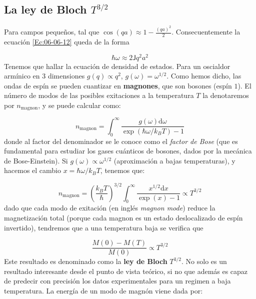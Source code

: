 \documentclass[12pt,a4paper]{book}
\numberwithin{equation}{section}
\numberwithin{figure}{section}
\newcommand{\parentesis}[1]{\left( #1  \right)}
\newcommand{\D}{\mathrm{d}}
\newcommand{\Jsf}{\mathsf{J}}
\begin{document}
\subsection{La ley de Bloch $T^{3/2}$}

Para campos pequeños, tal que $\cos (qa) \approx 1 - \frac{(qa)^2}{2}$. Consecuentemente la ecuación \ref{Ec:06-06-12} queda de la forma

\begin{equation}
    \hbar \omega \approx 2 \Jsf q^2 a^2
\end{equation}
Tenemos que hallar la ecuación de densidad de estados. Para un oscialdor armínico en 3 dimensiones $g(q) \varpropto q^2$, $g(\omega) = \omega^{1/2}$. Como hemos dicho, las ondas de espín se pueden cuantizar en \textbf{magnones}, que son bosones (espín $1$). El número de modos de las posibles exitaciones a la temperatura $T$ la denotaremos por $n_{\mathrm{magnon}}$, y se puede calcular como:

\begin{equation}
    n_{\mathrm{magnon}} = \int_0^\infty \frac{g(\omega) \D \omega}{\exp (\hbar \omega /k_B T) - 1} \label{Ec:06-06-14}
\end{equation}
donde al factor del denominador se le conoce como el \textit{factor de Bose} (que es fundamental para estudiar los gases cuánticos de bosones, dados por la mecánica de Bose-Einstein). Si $g(\omega) \varpropto \omega^{1/2}$ (aproximación a bajas temperaturas), y hacemos el cambio $x=\hbar \omega/k_B T$, tenemos que:

\begin{equation}
    n_{\mathrm{magnon}} = \parentesis{\frac{k_B T}{\hbar}}^{3/2} \int_0^\infty \frac{x^{1/2} \D x}{\exp (x) - 1} \varpropto T^{3/2} \label{Ec:06-06-15}
\end{equation}
dado que cada modo de exitación (en inglés \textit{magnon mode}) reduce la magnetización total (porque cada magnon es un estado deslocalizado de espín invertido), tendremos que a una temperatura baja se verifica que

\begin{equation}
    \frac{M(0)-M(T)}{M(0)} \varpropto T^{3/2}
\end{equation}
Este resultado es denominado como la \textbf{ley de Bloch} $T^{3/2}$. No solo es un resultado interesante desde el punto de vista teórico, si no que además es capaz de predecir con precisión los datos experimentales para un regimen a baja temperatura. La energía de un modo de magnón viene dada por:
\end{document}
